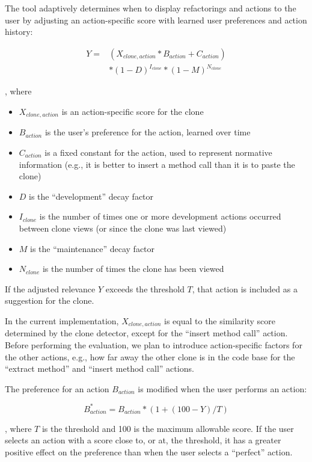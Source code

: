 \documentclass[preprint,10pt]{sigplanconf}
\begin{document}
The tool adaptively determines when to display refactorings and
actions to the user by adjusting an action-specific score with learned
user preferences and action history:

\begin{align*}
  Y = & (X_{clone,action} * B_{action} + C_{action}) \\
      & * (1-D)^{I_{clone}} * (1-M)^{N_{clone}}
\end{align*}

\noindent, where 
\begin{itemize}
  \item $X_{clone,action}$ is an action-specific score for the clone
  \item $B_{action}$ is the user's preference for the action, learned over time
  \item $C_{action}$ is a fixed constant for the action, used to
    represent normative information (e.g., it is better to insert a
    method call than it is to paste the clone)
  \item $D$ is the ``development'' decay factor
  \item $I_{clone}$ is the number of times one or more development
    actions occurred between clone views (or since the clone was last
    viewed)
  \item $M$ is the ``maintenance'' decay factor
  \item $N_{clone}$ is the number of times the clone has been viewed
\end{itemize} 

\noindent If the adjusted relevance $Y$ exceeds the threshold $T$,
that action is included as a suggestion for the clone.

In the current implementation, $X_{clone,action}$ is equal to the
similarity score determined by the clone detector, except for the
``insert method call'' action. Before performing the evaluation, we
plan to introduce action-specific factors for the other actions, e.g.,
how far away the other clone is in the code base for the ``extract
method'' and ``insert method call'' actions.

The preference for an action $B_{action}$ is modified when the user
performs an action:

\begin{equation}
  B^*_{action} = B_{action} * (1 + (100 - Y) / T)
\end{equation}

\noindent, where $T$ is the threshold and 100 is the maximum allowable
score. If the user selects an action with a score close to, or at, the
threshold, it has a greater positive effect on the preference than
when the user selects a ``perfect'' action.
\end{document}
